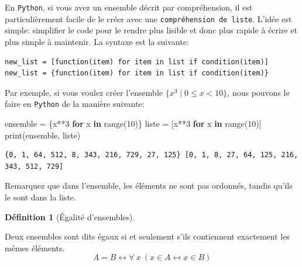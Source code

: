 \documentclass[
  letterpaper,
]{scrbook}
\newenvironment{Shaded}{}{}
\newcommand{\BuiltInTok}[1]{#1}
\newcommand{\ControlFlowTok}[1]{\textcolor[rgb]{0.00,0.44,0.13}{\textbf{#1}}}
\newcommand{\DecValTok}[1]{\textcolor[rgb]{0.25,0.63,0.44}{#1}}
\newcommand{\KeywordTok}[1]{\textcolor[rgb]{0.00,0.44,0.13}{\textbf{#1}}}
\newcommand{\NormalTok}[1]{#1}
\newcommand{\OperatorTok}[1]{\textcolor[rgb]{0.40,0.40,0.40}{#1}}
\newcommand{\set}[1]{\{#1\}}
\theoremstyle{plain}
\theoremstyle{definition}
\theoremstyle{definition}
\newtheorem{definition}{Définition}[chapter]
\theoremstyle{remark}
\begin{document}
En \texttt{Python}, si vous avez un ensemble décrit par compréhension,
il est particulièrement facile de le créer avec une
\texttt{compréhension\ de\ liste}. L'idée est simple: simplifier le code
pour le rendre plus lisible et donc plus rapide à écrire et plus simple
à maintenir. La syntaxe est la suivante:

\begin{verbatim}
new_list = [function(item) for item in list if condition(item)]
new_list = {function(item) for item in list if condition(item)}
\end{verbatim}

Par exemple, si vous voulez créer l'ensemble
\(\set{x^3\mid 0\leq x < 10}\), nous pouvons le faire en \texttt{Python}
de la manière suivante:

\hypertarget{comprehension-de-liste}{}
\begin{Shaded}
\begin{Highlighting}[]
\NormalTok{ensemble }\OperatorTok{=}\NormalTok{ \{x}\OperatorTok{**}\DecValTok{3} \ControlFlowTok{for}\NormalTok{ x }\KeywordTok{in} \BuiltInTok{range}\NormalTok{(}\DecValTok{10}\NormalTok{)\}}
\NormalTok{liste }\OperatorTok{=}\NormalTok{ [x}\OperatorTok{**}\DecValTok{3} \ControlFlowTok{for}\NormalTok{ x }\KeywordTok{in} \BuiltInTok{range}\NormalTok{(}\DecValTok{10}\NormalTok{)]}
\BuiltInTok{print}\NormalTok{(ensemble, liste)}
\end{Highlighting}
\end{Shaded}

\begin{verbatim}
{0, 1, 64, 512, 8, 343, 216, 729, 27, 125} [0, 1, 8, 27, 64, 125, 216, 343, 512, 729]
\end{verbatim}

\begin{tcolorbox}[enhanced jigsaw, opacityback=0, rightrule=.15mm, breakable, toprule=.15mm, colbacktitle=quarto-callout-note-color!10!white, title=\textcolor{quarto-callout-note-color}{\faInfo}\hspace{0.5em}{Note}, titlerule=0mm, arc=.35mm, colback=white, coltitle=black, colframe=quarto-callout-note-color-frame, bottomtitle=1mm, toptitle=1mm, bottomrule=.15mm, leftrule=.75mm, left=2mm, opacitybacktitle=0.6]

Remarquez que dans l'ensemble, les éléments ne sont pas ordonnés, tandis
qu'ils le sont dans la liste.

\end{tcolorbox}

\leavevmode{}%
\begin{definition}[Égalité d'ensembles]\label{def-egalite-ensembles}

Deux ensembles sont dits égaux si et seulement s'ils contiennent
exactement les mêmes éléments. \[
A=B \leftrightarrow \forall\ x\ (x\in A \leftrightarrow x\in B)
\]

\end{definition}
\end{document}
